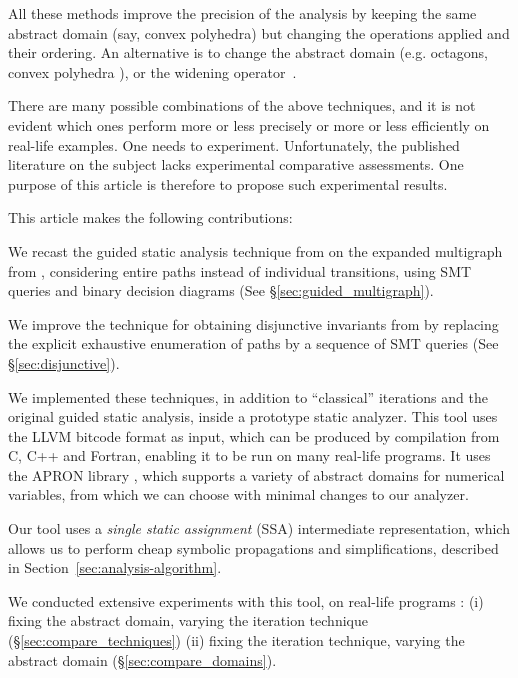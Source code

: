 \documentclass{llncs}
\newcommand{\avirer}[1]{{\color{red} #1}}
\newcommand{\avirer}[1]{}
\begin{document}
All these methods improve the precision of the analysis by keeping the
same abstract domain (say, convex polyhedra) but changing the
operations applied and their ordering. An alternative is to change the
abstract domain (e.g. octagons, convex polyhedra
\cite{DBLP:journals/lisp/Mine06}), or the widening
operator~\cite{BagnaraHRZ05SCP,Polka:FMSD:97}.

\avirer{There are many possible combinations of the above techniques, and it is not
evident which ones perform more or less precisely or more or less efficiently on real-life examples. One needs to experiment.
Unfortunately, the published literature on the subject lacks experimental comparative assessments. One purpose of this article is therefore to propose such experimental results.}

This article makes the following contributions:
\begin{compactenum}
\item We recast the guided static analysis technique from \cite{DBLP:conf/sas/GopanR07} on the expanded multigraph from \cite{Monniaux_Gonnord_SAS11}, considering entire paths instead of individual transitions, using SMT queries and binary decision diagrams\label{contr:guided_multigraph} (See \S\ref{sec:guided_multigraph}).
\item We improve the technique for obtaining disjunctive invariants from \cite{DBLP:conf/pldi/GulwaniZ10} by replacing the explicit exhaustive enumeration of paths by a sequence of SMT queries\label{contr:disjunctive} (See \S\ref{sec:disjunctive}).
\item We implemented these techniques, in addition to ``classical'' iterations and the original guided static analysis, inside a prototype static analyzer.
This tool uses the LLVM bitcode format \cite{Lattner:2004:LCF:977395.977673,LLVM_langref} as input, which can be produced by compilation from C, C++ and Fortran, enabling it to be run on many real-life programs.
It uses the APRON library \cite{DBLP:conf/cav/JeannetM09}, which
supports a variety of abstract domains for numerical variables, from
which we can choose with minimal changes to our analyzer.

\avirer{
Our tool uses a \emph{single static assignment} (SSA) intermediate representation, which allows us to perform cheap symbolic propagations and simplifications,
described in Section~\ref{sec:analysis-algorithm}.
}

\item We conducted extensive experiments with this tool, on real-life programs\avirer{: (i) fixing the abstract domain, varying the iteration technique (\S\ref{sec:compare_techniques}) (ii) fixing the iteration technique, varying the abstract domain (\S\ref{sec:compare_domains})}.
\end{compactenum}
\end{document}
